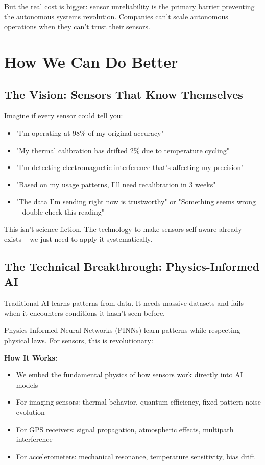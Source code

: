 \documentclass[11pt,letterpaper]{article}
\begin{document}
But the real cost is bigger: sensor unreliability is the primary barrier preventing the autonomous systems revolution. Companies can't scale autonomous operations when they can't trust their sensors.

\section*{How We Can Do Better}

\subsection*{The Vision: Sensors That Know Themselves}

Imagine if every sensor could tell you:
\begin{itemize}[leftmargin=10pt, itemsep=1pt]
    \item "I'm operating at 98\% of my original accuracy"
    \item "My thermal calibration has drifted 2\% due to temperature cycling"
    \item "I'm detecting electromagnetic interference that's affecting my precision"
    \item "Based on my usage patterns, I'll need recalibration in 3 weeks"
    \item "The data I'm sending right now is trustworthy" or "Something seems wrong – double-check this reading"
\end{itemize}

This isn't science fiction. The technology to make sensors self-aware already exists – we just need to apply it systematically.

\subsection*{The Technical Breakthrough: Physics-Informed AI}

Traditional AI learns patterns from data. It needs massive datasets and fails when it encounters conditions it hasn't seen before.

Physics-Informed Neural Networks (PINNs) learn patterns while respecting physical laws. For sensors, this is revolutionary:

\textbf{How It Works:}
\begin{itemize}[leftmargin=10pt, itemsep=1pt]
    \item We embed the fundamental physics of how sensors work directly into AI models
    \item For imaging sensors: thermal behavior, quantum efficiency, fixed pattern noise evolution
    \item For GPS receivers: signal propagation, atmospheric effects, multipath interference
    \item For accelerometers: mechanical resonance, temperature sensitivity, bias drift
\end{itemize}
\end{document}
